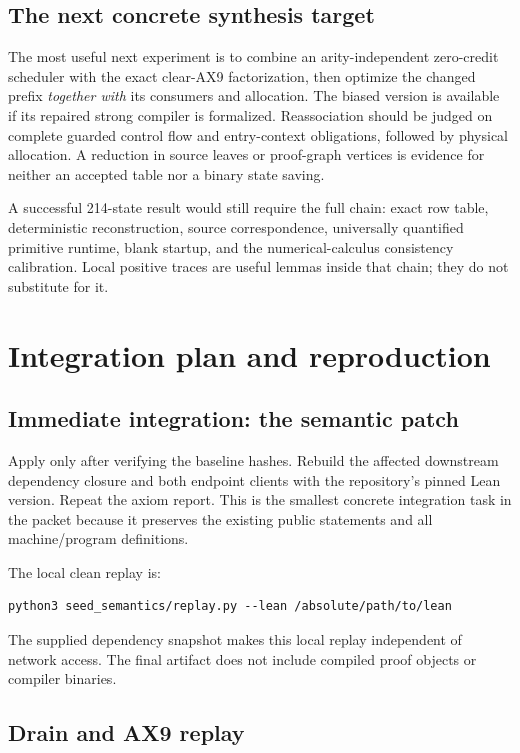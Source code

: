\documentclass[11pt]{article}
\newcommand{\code}[1]{\texttt{\detokenize{#1}}}
\begin{document}
\subsection{The next concrete synthesis target}

The most useful next experiment is to combine an arity-independent zero-credit scheduler with the exact clear-AX9 factorization, then optimize the changed prefix \emph{together with} its consumers and allocation. The biased version is available if its repaired strong compiler is formalized. Reassociation should be judged on complete guarded control flow and entry-context obligations, followed by physical allocation. A reduction in source leaves or proof-graph vertices is evidence for neither an accepted table nor a binary state saving.

A successful 214-state result would still require the full chain: exact row table, deterministic reconstruction, source correspondence, universally quantified primitive runtime, blank startup, and the numerical-calculus consistency calibration. Local positive traces are useful lemmas inside that chain; they do not substitute for it.

\section{Integration plan and reproduction}

\subsection{Immediate integration: the semantic patch}

Apply \code{seed_semantics/seed-semantics.patch} only after verifying the baseline hashes. Rebuild the affected downstream dependency closure and both endpoint clients with the repository's pinned Lean version. Repeat the axiom report. This is the smallest concrete integration task in the packet because it preserves the existing public statements and all machine/program definitions.

The local clean replay is:
\begin{lstlisting}
python3 seed_semantics/replay.py --lean /absolute/path/to/lean
\end{lstlisting}
The supplied dependency snapshot makes this local replay independent of network access. The final artifact does not include compiled proof objects or compiler binaries.

\subsection{Drain and AX9 replay}
\end{document}
